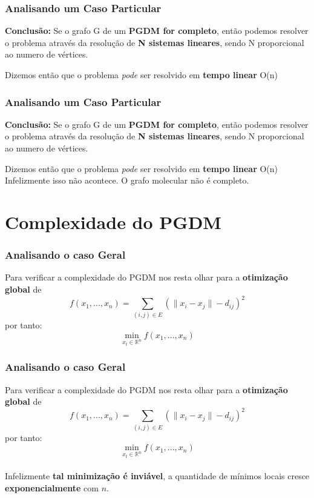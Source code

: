 \documentclass{beamer}
\begin{document}
\begin{frame}
\frametitle{\normalsize Analisando um Caso Particular}
\begin{center}
	\textbf{Conclusão:} Se o grafo G de um \textbf{PGDM for completo}, então podemos resolver o problema através da resolução de\textbf{ N sistemas lineares}, sendo N proporcional ao numero de vértices.
\end{center}

\large Dizemos então que o problema \textit{pode} ser resolvido em \textbf{tempo linear} \vspace{-0.2cm}\center \color{red}O(n)
\end{frame}

\begin{frame}
\frametitle{\normalsize Analisando um Caso Particular}
\begin{center}
\textbf{Conclusão:} Se o grafo G de um \textbf{PGDM for completo}, então podemos resolver o problema através da resolução de\textbf{ N sistemas lineares}, sendo N proporcional ao numero de vértices.
\end{center}

\large Dizemos então que o problema \textit{pode} ser resolvido em \textbf{tempo linear} \vspace{-0.2cm}\center \color{red}O(n)
\color{black}
\\\vspace{1cm}
Infelizmente isso não acontece. O grafo molecular não é completo.
\end{frame}

\section{Complexidade do PGDM}
\begin{frame}
\frametitle{\normalsize Analisando o caso Geral}
Para verificar a complexidade do PGDM nos resta olhar para a \textbf{otimização global} de
$$ f(x_1, ...,x_n) = \sum_{(i,j) \in E} (\|x_i - x_j\| - d_{ij})^2$$
por tanto:
$$ \min_{x_t \in\mathbb{R}^n} f(x_1, ...,x_n)$$
\end{frame}

\begin{frame}
\frametitle{\normalsize Analisando o caso Geral}
Para verificar a complexidade do PGDM nos resta olhar para a \textbf{otimização global} de
$$ f(x_1, ...,x_n) = \sum_{(i,j) \in E} (\|x_i - x_j\| - d_{ij})^2$$
por tanto:
$$ \min_{x_t \in\mathbb{R}^n} f(x_1, ...,x_n)$$
\\\vspace{0.2cm}Infelizmente \textbf{tal minimização é inviável}, a quantidade de mínimos locais cresce \textbf{exponencialmente} com $n$.
\end{frame}
\end{document}
